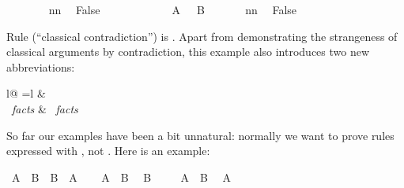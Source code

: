 \begin{isabellebody}
\ \ \ \ \ \ \isamarkupfalse%
\ nn\ \isamarkupfalse%
\ False\ \isamarkupfalse%
\isacommand{{\isachardot}{\isachardot}}\isanewline
\ \ \ \ \isamarkupfalse%
\isanewline
\ \ \ \ \isamarkupfalse%
\ {\isachardoublequote}{\isasymnot}\ A\ {\isasymor}\ {\isasymnot}\ B{\isachardoublequote}\ \isamarkupfalse%
\isacommand{{\isachardot}{\isachardot}}\isanewline
\ \ \ \ \isamarkupfalse%
\ nn\ \isamarkupfalse%
\ False\ \isamarkupfalse%
\isacommand{{\isachardot}{\isachardot}}\isanewline
\ \ \isamarkupfalse%
\isanewline
\isamarkupfalse%
\isamarkupfalse%
%
\begin{isamarkuptext}%
\noindent
Rule  (``classical contradiction'') is
.
Apart from demonstrating the strangeness of classical
arguments by contradiction, this example also introduces two new
abbreviations:
\begin{center}
\begin{tabular}{l@ {\quad=\quad}l}
 &   \\
~\emph{facts} &
~\emph{facts} 
\end{tabular}
\end{center}%
\end{isamarkuptext}%
\isamarkuptrue%
%
\isamarkuptrue%
%
\begin{isamarkuptext}%
So far our examples have been a bit unnatural: normally we want to
prove rules expressed with \isa{{\isasymLongrightarrow}}, not \isa{{\isasymlongrightarrow}}. Here is an example:%
\end{isamarkuptext}%
\isamarkuptrue%
\ {\isachardoublequote}A\ {\isasymand}\ B\ {\isasymLongrightarrow}\ B\ {\isasymand}\ A{\isachardoublequote}\isanewline
\isamarkupfalse%
\isanewline
\ \ \isamarkupfalse%
\ {\isachardoublequote}A\ {\isasymand}\ B{\isachardoublequote}\ \isamarkupfalse%
\ {\isachardoublequote}B{\isachardoublequote}\ \isamarkupfalse%
\isacommand{{\isachardot}{\isachardot}}\isanewline
\isamarkupfalse%
\isanewline
\ \ \isamarkupfalse%
\ {\isachardoublequote}A\ {\isasymand}\ B{\isachardoublequote}\ \isamarkupfalse%
\ {\isachardoublequote}A{\isachardoublequote}\ \isamarkupfalse%

\end{isabellebody}
